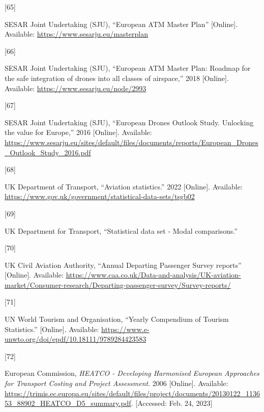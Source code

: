 \documentclass[
  11pt,
  a4paper,
]{book}
\newlength{\cslhangindent}
\newlength{\csllabelwidth}
\newlength{\cslentryspacingunit} %
\newenvironment{CSLReferences}[2] %
 {%
  \setlength{\parindent}{0pt}
  \ifodd #1
  \let\oldpar\par
  \def\par{\hangindent=\cslhangindent\oldpar}
  \fi
  \setlength{\parskip}{#2\cslentryspacingunit}
 }%
 {}
\newcommand{\CSLLeftMargin}[1]{\parbox[t]{\csllabelwidth}{#1}}
\newcommand{\CSLRightInline}[1]{\parbox[t]{\linewidth - \csllabelwidth}{#1}\break}
\begin{document}
\begin{CSLReferences}{0}{0}
\leavevmode{}%
\CSLLeftMargin{{[}65{]} }%
\CSLRightInline{SESAR Joint Undertaking (SJU), {``European {ATM Master
Plan}''} {[}Online{]}. Available:
\url{https://www.sesarju.eu/masterplan}}

\leavevmode{}%
\CSLLeftMargin{{[}66{]} }%
\CSLRightInline{SESAR Joint Undertaking (SJU), {``European {ATM Master
Plan}: {Roadmap} for the safe integration of drones into all classes of
airspace,''} 2018 {[}Online{]}. Available:
\url{https://www.sesarju.eu/node/2993}}

\leavevmode{}%
\CSLLeftMargin{{[}67{]} }%
\CSLRightInline{SESAR Joint Undertaking (SJU), {``European {Drones
Outlook Study}. {Unlocking} the value for {Europe},''} 2016
{[}Online{]}. Available:
\url{https://www.sesarju.eu/sites/default/files/documents/reports/European_Drones_Outlook_Study_2016.pdf}}

\leavevmode{}%
\CSLLeftMargin{{[}68{]} }%
\CSLRightInline{UK Department of Transport, {``Aviation statistics.''}
2022 {[}Online{]}. Available:
\url{https://www.gov.uk/government/statistical-data-sets/tsgb02}}

\leavevmode{}%
\CSLLeftMargin{{[}69{]} }%
\CSLRightInline{UK Department for Transport, {``Statistical data set -
{Modal} comparisons.''} }

\leavevmode{}%
\CSLLeftMargin{{[}70{]} }%
\CSLRightInline{UK Civil Aviation Authority, {``Annual {Departing
Passenger Survey} reports''} {[}Online{]}. Available:
\url{https://www.caa.co.uk/Data-and-analysis/UK-aviation-market/Consumer-research/Departing-passenger-survey/Survey-reports/}}

\leavevmode{}%
\CSLLeftMargin{{[}71{]} }%
\CSLRightInline{UN World Tourism and Organisation, {``Yearly
{Compendium} of {Tourism Statistics}.''} {[}Online{]}. Available:
\url{https://www.e-unwto.org/doi/epdf/10.18111/9789284423583}}

\leavevmode{}%
\CSLLeftMargin{{[}72{]} }%
\CSLRightInline{European Commission, \emph{{HEATCO} - {Developing
Harmonised European Approaches} for {Transport Costing} and {Project
Assessment}}. 2006 {[}Online{]}. Available:
\url{https://trimis.ec.europa.eu/sites/default/files/project/documents/20130122_113653_88902_HEATCO_D5_summary.pdf}.
{[}Accessed: Feb. 24, 2023{]}}


\end{CSLReferences}
\end{document}
